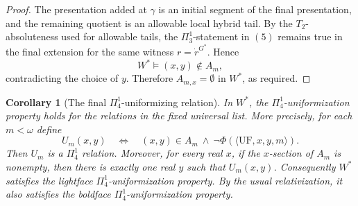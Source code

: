 \documentclass[a4paper,11pt]{article}
\newtheorem{corollary}[theorem]{Corollary}
\begin{document}
\begin{proof}
The presentation added at \(\gamma\) is an initial segment of the final presentation, and the remaining quotient is an allowable local hybrid tail.  By the \(T_2\)-absoluteness used for allowable tails, the \(\Pi^1_3\)-statement in \((5)\) remains true in the final extension for the same witness \(r=\dot r^{G^\ast}\).  Hence
\[
   W^\ast\models (x,y)\notin A_m,
\]
contradicting the choice of \(y\).  Therefore \(A_{m,x}=\emptyset\) in \(W^\ast\), as required.
\end{proof}

\begin{corollary}[The final \(\Pi^1_4\)-uniformizing relation]\label{cor:final-pi14-uniformization-local}
In \(W^\ast\), the \(\Pi^1_4\)-uniformization property holds for the relations in the fixed universal list.  More precisely, for each \(m<\omega\) define
\[
   U_m(x,y)
   \quad\Longleftrightarrow\quad
   (x,y)\in A_m
   \ \land\
   \neg\Phi(\langle\mathrm{UF},x,y,m\rangle).
\]
Then \(U_m\) is a \(\Pi^1_4\) relation.  Moreover, for every real \(x\), if the \(x\)-section of \(A_m\) is nonempty, then there is exactly one real \(y\) such that \(U_m(x,y)\).
Consequently \(W^\ast\) satisfies the lightface \(\Pi^1_4\)-uniformization property.  By the usual relativization, it also satisfies the boldface \(\Pi^1_4\)-uniformization property.
\end{corollary}
\end{document}
